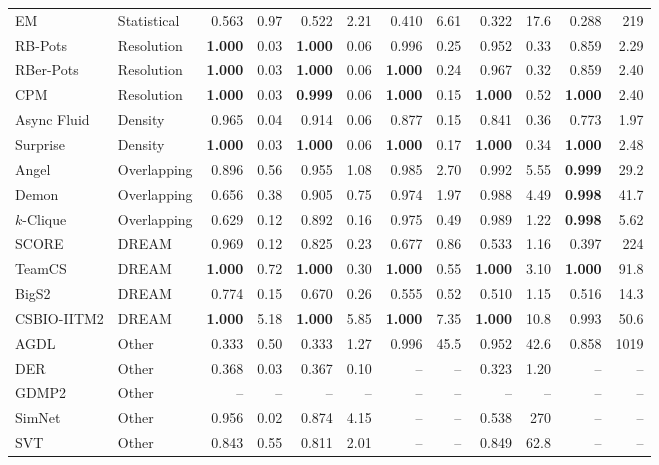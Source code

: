 \begin{table}[t]
\begin{tabular}{llrrrrrrrrrr}
EM & Statistical & 0.563 & 0.97 & 0.522 & 2.21 & 0.410 & 6.61 & 0.322 & 17.6 & 0.288 & 219 \\
RB-Pots & Resolution & \textbf{1.000} & 0.03 & \textbf{1.000} & 0.06 & 0.996 & 0.25 & 0.952 & 0.33 & 0.859 & 2.29 \\
RBer-Pots & Resolution & \textbf{1.000} & 0.03 & \textbf{1.000} & 0.06 & \textbf{1.000} & 0.24 & 0.967 & 0.32 & 0.859 & 2.40 \\
CPM & Resolution & \textbf{1.000} & 0.03 & \textbf{0.999} & 0.06 & \textbf{1.000} & 0.15 & \textbf{1.000} & 0.52 & \textbf{1.000} & 2.40 \\
Async Fluid & Density & 0.965 & 0.04 & 0.914 & 0.06 & 0.877 & 0.15 & 0.841 & 0.36 & 0.773 & 1.97 \\
Surprise & Density & \textbf{1.000} & 0.03 & \textbf{1.000} & 0.06 & \textbf{1.000} & 0.17 & \textbf{1.000} & 0.34 & \textbf{1.000} & 2.48 \\
Angel & Overlapping & 0.896 & 0.56 & 0.955 & 1.08 & 0.985 & 2.70 & 0.992 & 5.55 & \textbf{0.999} & 29.2 \\
Demon & Overlapping & 0.656 & 0.38 & 0.905 & 0.75 & 0.974 & 1.97 & 0.988 & 4.49 & \textbf{0.998} & 41.7 \\
$k$-Clique & Overlapping & 0.629 & 0.12 & 0.892 & 0.16 & 0.975 & 0.49 & 0.989 & 1.22 & \textbf{0.998} & 5.62 \\
SCORE & DREAM & 0.969 & 0.12 & 0.825 & 0.23 & 0.677 & 0.86 & 0.533 & 1.16 & 0.397 & 224 \\
TeamCS & DREAM & \textbf{1.000} & 0.72 & \textbf{1.000} & 0.30 & \textbf{1.000} & 0.55 & \textbf{1.000} & 3.10 & \textbf{1.000} & 91.8 \\
BigS2 & DREAM & 0.774 & 0.15 & 0.670 & 0.26 & 0.555 & 0.52 & 0.510 & 1.15 & 0.516 & 14.3 \\
CSBIO-IITM2 & DREAM & \textbf{1.000} & 5.18 & \textbf{1.000} & 5.85 & \textbf{1.000} & 7.35 & \textbf{1.000} & 10.8 & 0.993 & 50.6 \\
AGDL & Other & 0.333 & 0.50 & 0.333 & 1.27 & 0.996 & 45.5 & 0.952 & 42.6 & 0.858 & 1019 \\
DER & Other & 0.368 & 0.03 & 0.367 & 0.10 & -- & -- & 0.323 & 1.20 & -- & -- \\
GDMP2 & Other & -- & -- & -- & -- & -- & -- & -- & -- & -- & -- \\
SimNet & Other & 0.956 & 0.02 & 0.874 & 4.15 & -- & -- & 0.538 & 270 & -- & -- \\
SVT & Other & 0.843 & 0.55 & 0.811 & 2.01 & -- & -- & 0.849 & 62.8 & -- & -- \\

\end{tabular}
\end{table}
